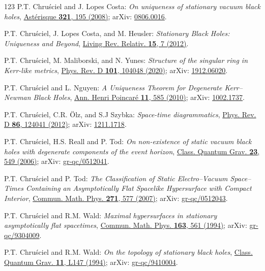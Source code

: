 \begin{thebibliography}{123}
P.T. Chru\'sciel and J. Lopes Costa:
{\em On uniqueness of stationary vacuum black holes},
\href{http://www.numdam.org/item/AST_2008__321__195_0/}{Astérisque {\bf 321}, 195 (2008)};
arXiv: \href{https://arxiv.org/abs/0806.0016}{0806.0016}.

P.T. Chru\'sciel, J. Lopes Costa, and M. Heusler:
{\em Stationary Black Holes: Uniqueness and Beyond},
\href{https://doi.org/10.12942/lrr-2012-7}{Living Rev. Relativ. {\bf 15}, 7 (2012)}.

P.T. Chru\'sciel, M. Maliborski, and N. Yunes:
{\em Structure of the singular ring in Kerr-like metrics},
\href{https://doi.org/10.1103/PhysRevD.101.104048}{Phys. Rev. D {\bf 101}, 104048 (2020)};
arXiv: \href{https://arxiv.org/abs/1912.06020}{1912.06020}.

P.T. Chru\'sciel and L. Nguyen:
{\em A Uniqueness Theorem for Degenerate Kerr–Newman Black Holes},
\href{https://doi.org/10.1007/s00023-010-0038-3}{Ann. Henri Poincaré {\bf 11}, 585 (2010)};
arXiv: \href{https://arxiv.org/abs/1002.1737}{1002.1737}.

P.T. Chru\'sciel, C.R. Ölz, and S.J Szybka:
{\em Space-time diagrammatics},
\href{https://doi.org/10.1103/PhysRevD.86.124041}{Phys. Rev. D {\bf 86}, 124041 (2012)};
arXiv: \href{https://arxiv.org/abs/1211.1718}{1211.1718}.

P.T. Chru\'sciel, H.S. Reall and P. Tod:
{\em On non-existence of static vacuum black holes with degenerate components of the event horizon},
\href{https://doi.org/10.1088/0264-9381/23/2/018}{Class. Quantum Grav. {\bf 23}, 549 (2006)};
arXiv: \href{https://arxiv.org/abs/gr-qc/0512041}{gr-qc/0512041}.

P.T. Chru\'sciel and P. Tod:
{\em The Classification of Static Electro–Vacuum Space–Times Containing an Asymptotically Flat Spacelike Hypersurface with Compact Interior},
\href{https://doi.org/10.1007/s00220-007-0191-9}{Commun. Math. Phys. {\bf 271}, 577 (2007)};
arXiv: \href{https://arxiv.org/abs/gr-qc/0512043}{gr-qc/0512043}.

P.T. Chru\'sciel and R.M. Wald:
{\em Maximal hypersurfaces in stationary asymptotically flat spacetimes},
\href{https://doi.org/10.1007/BF02101463}{Commun. Math. Phys. {\bf 163}, 561 (1994)};
arXiv: \href{https://arxiv.org/abs/gr-qc/9304009}{gr-qc/9304009}.

P.T. Chru\'sciel and R.M. Wald:
{\em On the topology of stationary black holes},
\href{https://doi.org/10.1088/0264-9381/11/12/001}{Class. Quantum Grav. {\bf 11}, L147 (1994)};
arXiv: \href{https://arxiv.org/abs/gr-qc/9410004}{gr-qc/9410004}.


\end{thebibliography}
